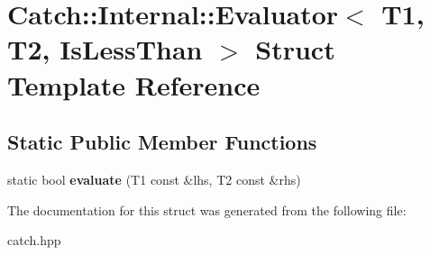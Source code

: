 \hypertarget{struct_catch_1_1_internal_1_1_evaluator_3_01_t1_00_01_t2_00_01_is_less_than_01_4}{}\section{Catch\+:\+:Internal\+:\+:Evaluator$<$ T1, T2, Is\+Less\+Than $>$ Struct Template Reference}
\label{struct_catch_1_1_internal_1_1_evaluator_3_01_t1_00_01_t2_00_01_is_less_than_01_4}
\subsection*{Static Public Member Functions}
\begin{DoxyCompactItemize}
\item 
\mbox{\label{struct_catch_1_1_internal_1_1_evaluator_3_01_t1_00_01_t2_00_01_is_less_than_01_4_a75b2bcf80ce6f90218c145e2c3293d75}} 
static bool {\bfseries evaluate} (T1 const \&lhs, T2 const \&rhs)
\end{DoxyCompactItemize}


The documentation for this struct was generated from the following file\+:\begin{DoxyCompactItemize}
\item 
catch.\+hpp\end{DoxyCompactItemize}
